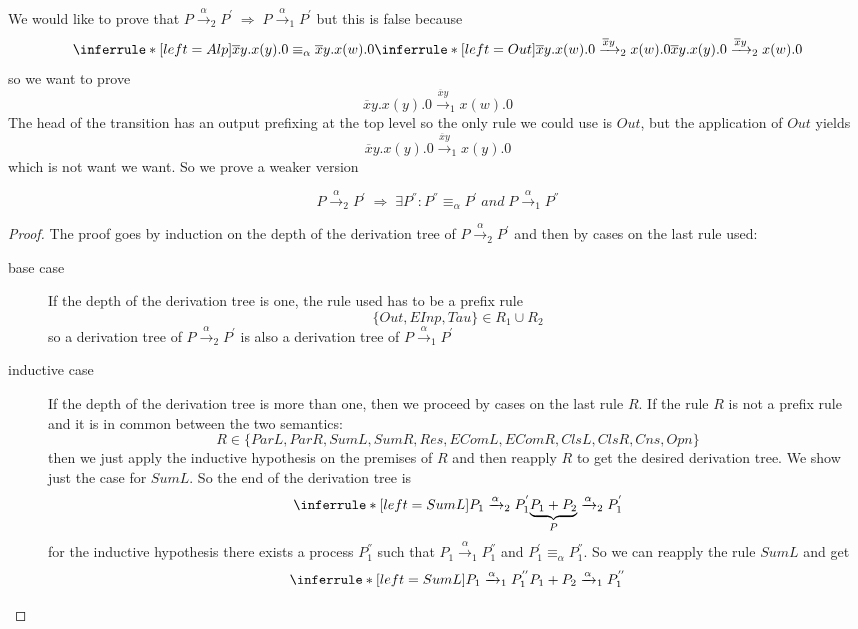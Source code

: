 We would like to prove that $P\xrightarrow{\alpha}_{2}P^{'}\; \Rightarrow\; P\xrightarrow{\alpha}_{1}P^{'}$ but this is false because
\[
  \inferrule* [left=Alp]{
      \overline{x}y.x(y).0 \equiv_{\alpha} \overline{x}y.x(w).0
    \\
      \inferrule* [left=Out]{
      }{
	\overline{x}y.x(w).0\xrightarrow{\overline{x}y}_{2}x(w).0
      }
  }{
    \overline{x}y.x(y).0\xrightarrow{\overline{x}y}_{2}x(w).0
  }
\]
so we want to prove 
\[
  \overline{x}y.x(y).0\xrightarrow{\overline{x}y}_{1}x(w).0
\] 
The head of the transition has an output prefixing at the top level so the only rule we could use is $Out$, but the application of $Out$ yields 
\[
  \overline{x}y.x(y).0\xrightarrow{\overline{x}y}_{1}x(y).0
\] 
which is not want we want. So we prove a weaker version
\begin{theorem}
\[
  P\xrightarrow{\alpha}_{2}P^{'}\; \Rightarrow\; \exists P^{''}: P^{''}\equiv_{\alpha}P^{'}\; and\; P\xrightarrow{\alpha}_{1}P^{''}
\]
  \begin{proof}
    The proof goes by induction on the depth of the derivation tree of $P\xrightarrow{\alpha}_{2}P^{'}$ and then by cases on the last rule used:
    \begin{description}
      \item[base case]
	If the depth of the derivation tree is one, the rule used has to be a prefix rule 
	\[
	  \{Out, EInp, Tau\}\in R_{1}\cup R_{2}
	\]
	so a derivation tree of $P\xrightarrow{\alpha}_{2}P^{'}$ is also a derivation tree of $P\xrightarrow{\alpha}_{1}P^{'}$
      \item[inductive case]
	If the depth of the derivation tree is more than one, then we proceed by cases on the last rule $R$. If the rule $R$ is not a prefix rule and it is in common between the two semantics:
	\[
	  R\in \{ParL, ParR, SumL, SumR, Res, EComL, EComR, ClsL, ClsR, Cns, Opn\}
	\]
	then we just apply the inductive hypothesis on the premises of $R$ and then reapply $R$ to get the desired derivation tree. We show just the case for $SumL$. So the end of the derivation tree is 
	\[
	  \inferrule* [left=SumL]{
	    P_{1}\xrightarrow{\alpha}_{2}P_{1}^{'}
	  }{
	    \underbrace{P_{1}+P_{2}}_{P}\xrightarrow{\alpha}_{2}P_{1}^{'}
	  }
	\]
	for the inductive hypothesis there exists a process $P_{1}^{''}$ such that $P_{1}\xrightarrow{\alpha}_{1}P_{1}^{''}$ and $P_{1}^{'}\equiv_{\alpha}P_{1}^{''}$. So we can reapply the rule $SumL$ and get
	\[
	  \inferrule* [left=SumL]{
	    P_{1}\xrightarrow{\alpha}_{1}P_{1}^{''}
	  }{
	    P_{1}+P_{2}\xrightarrow{\alpha}_{1}P_{1}^{''}
}\]
\end{description}
\end{proof}
\end{theorem}

